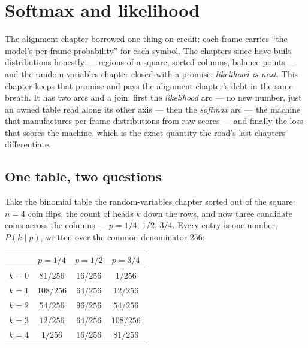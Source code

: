 \chapter{Softmax and likelihood}

\begin{narrative}
The alignment chapter borrowed one thing on credit: each frame carries
``the model's per-frame probability'' for each symbol. The chapters
since have built distributions honestly — regions of a square, sorted
columns, balance points — and the random-variables chapter closed with
a promise: \emph{likelihood is next}. This chapter keeps that promise
and pays the alignment chapter's debt in the same breath. It has two
arcs and a join: first the \emph{likelihood} arc — no new number,
just an owned table read along its other axis — then the
\emph{softmax} arc — the machine that manufactures per-frame
distributions from raw scores — and finally the loss that scores the
machine, which is the exact quantity the road's last chapters
differentiate.

\section{One table, two questions}

Take the binomial table the random-variables chapter sorted out of the
square: $n = 4$ coin flips, the count of heads $k$ down the rows, and
now three candidate coins across the columns — $p = 1/4$, $1/2$,
$3/4$. Every entry is one number, $P(k \mid p)$, written over the
common denominator $256$:

\begin{center}
\begin{tabular}{c|ccc}
 & $p = 1/4$ & $p = 1/2$ & $p = 3/4$ \\
\hline
$k=0$ & $81/256$ & $16/256$ & $1/256$ \\
$k=1$ & $108/256$ & $64/256$ & $12/256$ \\
$k=2$ & $54/256$ & $96/256$ & $54/256$ \\
$k=3$ & \textcolor{AccentInk}{$12/256$} &
  \textcolor{AccentInk}{$64/256$} &
  \textcolor{AccentInk}{$108/256$} \\
$k=4$ & $1/256$ & $16/256$ & $81/256$ \\
\end{tabular}
\end{center}


\end{narrative}
